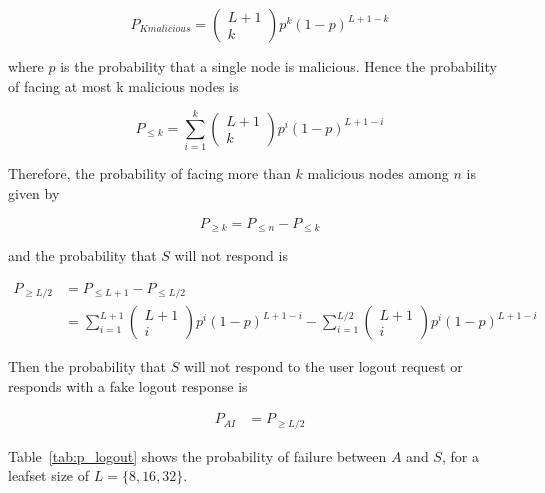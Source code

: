     \begin{equation}
      P_{K malicious} = \begin{pmatrix} L+1 \\ k\end{pmatrix} p^k (1-p)^{L+1-k}
    \end{equation}

    where $p$ is the probability that a single node is malicious. Hence the
probability of facing at most k malicious nodes is 

    \begin{equation}
      P_{\leq k} = \sum_{i=1}^{k} \begin{pmatrix} L+1 \\ k\end{pmatrix} p^i (1-p)^{L+1-i}
    \end{equation}

    Therefore, the probability of facing more than $k$ malicious nodes among
$n$ is given by

    \begin{equation}
      P_{\ge k} = P_{\leq n} - P_{\leq k}
    \end{equation}

    and the probability that $S$ will not respond is

    \begin{align}
      P_{\ge L/2} &= P_{\leq L+1} - P_{\leq L/2} \\
      &= \sum_{i=1}^{L+1} \begin{pmatrix} L+1 \\ i\end{pmatrix} p^i (1-p)^{L+1-i}
      - \sum_{i=1}^{L/2} \begin{pmatrix} L+1 \\ i\end{pmatrix} p^i (1-p)^{L+1-i}
    \end{align}


    Then the probability that $S$ will not respond to the user logout 
request or responds with a fake logout response is

    \begin{align}
      P_{AI} &= P_{\ge L/2} 
    \end{align}


    Table~\eqref{tab:p_logout} shows the probability of failure
between $A$ and $S$, for a leafset size of $L = \{8,16,32\}$.

